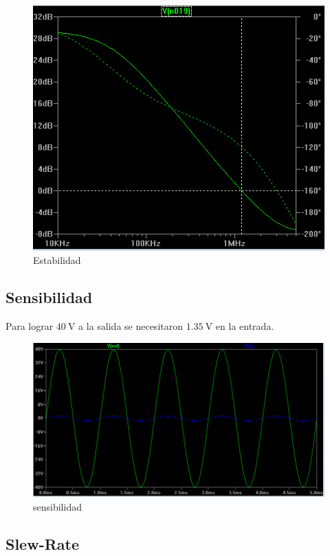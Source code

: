 \documentclass[a4paper,12pt,twoside]{article}
\newcommand{\volt}{\ensuremath{~\mathrm{V}}}
\begin{document}
\begin{figure}[H]
\centering
\includegraphics[scale=0.6]{img/estabilidad}
\caption{Estabilidad}
\label{estabilidad} 
\end{figure}


\subsection{Sensibilidad}

Para lograr $40 \volt$ a la salida se necesitaron $1.35 \volt$ en la entrada.

\begin{figure}[H]
\centering
\includegraphics[scale=0.6]{img/sensibilidad}
\caption{sensibilidad}
\label{sens} 
\end{figure}


\subsection{Slew-Rate}
\end{document}
